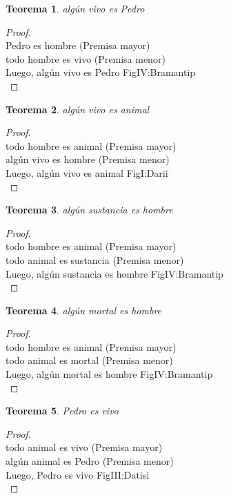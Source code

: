 ﻿\documentclass[12pt]{book}
\newtheorem{theorem}{Teorema}[chapter]
\newtheorem{proof}{Demostración}
\begin{document}
\begin{theorem}
algún vivo es Pedro
\label{th: 44}
\end{theorem}\begin{proof}\\Pedro es hombre	 (Premisa mayor) \\todo hombre es vivo	 (Premisa menor) \\Luego, algún vivo es Pedro	FigIV:Bramantip \\ \end{proof}
\begin{theorem}
algún vivo es animal
\label{th: 45}
\end{theorem}\begin{proof}\\todo hombre es animal	 (Premisa mayor) \\algún vivo es hombre	 (Premisa menor) \\Luego, algún vivo es animal	FigI:Darii \\ \end{proof}
\begin{theorem}
algún sustancia es hombre
\label{th: 46}
\end{theorem}\begin{proof}\\todo hombre es animal	 (Premisa mayor) \\todo animal es sustancia	 (Premisa menor) \\Luego, algún sustancia es hombre	FigIV:Bramantip \\ \end{proof}
\begin{theorem}
algún mortal es hombre
\label{th: 47}
\end{theorem}\begin{proof}\\todo hombre es animal	 (Premisa mayor) \\todo animal es mortal	 (Premisa menor) \\Luego, algún mortal es hombre	FigIV:Bramantip \\ \end{proof}
\begin{theorem}
Pedro es vivo
\label{th: 48}
\end{theorem}\begin{proof}\\todo animal es vivo	 (Premisa mayor) \\algún animal es Pedro	 (Premisa menor) \\Luego, Pedro es vivo	FigIII:Datisi \\ \end{proof}
\end{document}
